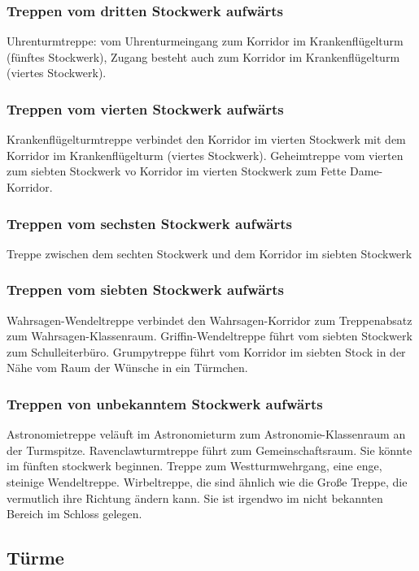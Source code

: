 \documentclass[a4paper, 10pt]{article}
\begin{document}
\subsubsection*{\large Treppen vom dritten Stockwerk aufwärts}
Uhrenturmtreppe: vom Uhrenturmeingang zum Korridor im Krankenflügelturm (fünftes Stockwerk), Zugang besteht auch zum Korridor im Krankenflügelturm (viertes Stockwerk).
\subsubsection*{\large Treppen vom vierten Stockwerk aufwärts}
Krankenflügelturmtreppe verbindet den Korridor im vierten Stockwerk mit dem Korridor im Krankenflügelturm (viertes Stockwerk).
Geheimtreppe vom vierten zum siebten Stockwerk vo Korridor im vierten Stockwerk zum Fette Dame-Korridor.
\subsubsection*{\large Treppen vom sechsten Stockwerk aufwärts}
Treppe zwischen dem sechten Stockwerk und dem Korridor im siebten Stockwerk
\subsubsection*{\large Treppen vom siebten Stockwerk aufwärts}
Wahrsagen-Wendeltreppe verbindet den Wahrsagen-Korridor zum Treppenabsatz zum Wahrsagen-Klassenraum.
Griffin-Wendeltreppe führt vom siebten Stockwerk zum Schulleiterbüro.
Grumpytreppe führt vom Korridor im siebten Stock in der Nähe vom Raum der Wünsche in ein Türmchen.
\subsubsection*{\large Treppen von unbekanntem Stockwerk aufwärts}
Astronomietreppe veläuft im Astronomieturm zum Astronomie-Klassenraum an der Turmspitze.
Ravenclawturmtreppe führt zum Gemeinschaftsraum. Sie könnte im fünften stockwerk beginnen.
Treppe zum Westturmwehrgang, eine enge, steinige Wendeltreppe.
Wirbeltreppe, die sind ähnlich wie die Große Treppe, die vermutlich ihre Richtung ändern kann. Sie ist irgendwo im nicht bekannten Bereich im Schloss gelegen.

\subsection*{\Large Türme}
\end{document}
